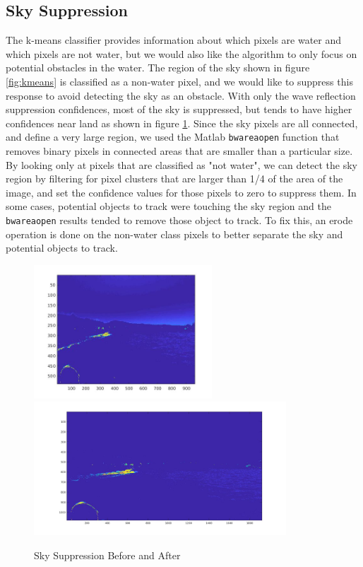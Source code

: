 \documentclass{article}
\begin{document}
\subsection{Sky Suppression}
The k-means classifier provides information about which pixels are water and
which pixels are not water, but we would also like the algorithm to only focus
on potential obstacles in the water.  The region of the sky shown in figure
\ref{fig:kmeans} is classified as a non-water pixel, and we would like to
suppress this response to avoid detecting the sky as an obstacle. With only the
wave reflection suppression confidences, most of the sky is suppressed, but
tends to have higher confidences near land as shown in figure
\ref{fig:skysuppress}.  Since the sky pixels are all connected, and define a
very large region, we used the Matlab \texttt{bwareaopen} function that removes binary
pixels in connected areas that are smaller than a particular size.  By looking
only at pixels that are classified as "not water", we can detect the sky region
by filtering for pixel clusters that are larger than 1/4 of the area of the
image, and set the confidence values for those pixels to zero to suppress them.
In some cases, potential objects to track were touching the sky region and the
\texttt{bwareaopen} results tended to remove those object to track.  To fix this, an
erode operation is done on the non-water class pixels to better separate the sky
and potential objects to track.

\begin{figure}
\includegraphics[height=5cm]{hsv_confidence}
\includegraphics[height=5cm]{hsv_kmeans2_suppressed}
\centering
\caption{Sky Suppression Before and After}
\label{fig:skysuppress}
\end{figure}
\end{document}
